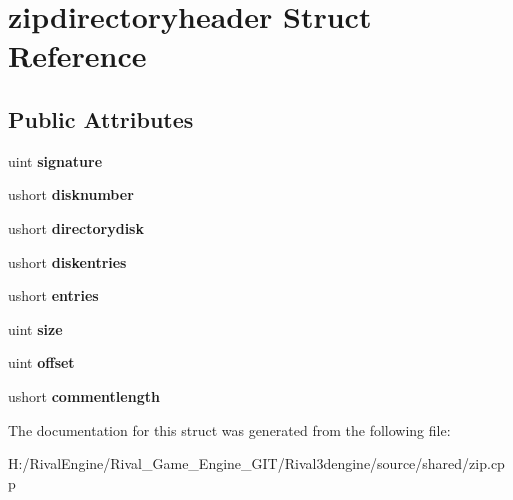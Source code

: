 \hypertarget{structzipdirectoryheader}{}\section{zipdirectoryheader Struct Reference}
\label{structzipdirectoryheader}
\subsection*{Public Attributes}
\begin{DoxyCompactItemize}
\item 
\mbox{\label{structzipdirectoryheader_ac0270c24a1aceadd9ac42c356745c9b4}} 
uint {\bfseries signature}
\item 
\mbox{\label{structzipdirectoryheader_ac91d4b0be4a9418e012579691675b5e1}} 
ushort {\bfseries disknumber}
\item 
\mbox{\label{structzipdirectoryheader_a09933df40547cdfc543f8e4915ad0d0e}} 
ushort {\bfseries directorydisk}
\item 
\mbox{\label{structzipdirectoryheader_adea729022d4ed513816e2d3b2327a4dc}} 
ushort {\bfseries diskentries}
\item 
\mbox{\label{structzipdirectoryheader_aa199d377900d69a28cc5cd6cd8c1d0b6}} 
ushort {\bfseries entries}
\item 
\mbox{\label{structzipdirectoryheader_afe0df7ccb126e8cd43f8abf60385aac3}} 
uint {\bfseries size}
\item 
\mbox{\label{structzipdirectoryheader_a0a6f73e97d69dc6d44b74b11ca605314}} 
uint {\bfseries offset}
\item 
\mbox{\label{structzipdirectoryheader_ac202c310a605b733e2fcb0b742de00eb}} 
ushort {\bfseries commentlength}
\end{DoxyCompactItemize}


The documentation for this struct was generated from the following file\+:\begin{DoxyCompactItemize}
\item 
H\+:/\+Rival\+Engine/\+Rival\+\_\+\+Game\+\_\+\+Engine\+\_\+\+G\+I\+T/\+Rival3dengine/source/shared/zip.\+cpp\end{DoxyCompactItemize}
